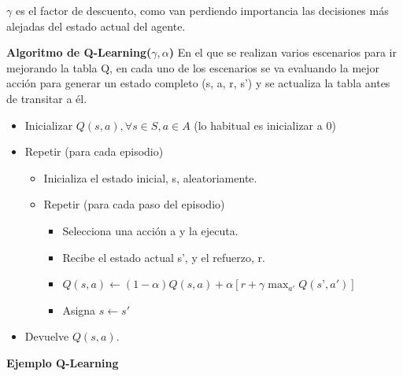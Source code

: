 \documentclass[12pt]{report} %
\begin{document}
$\gamma$ es el factor de descuento, como van perdiendo importancia las decisiones más alejadas del estado actual del agente.

\textbf{Algoritmo de Q-Learning($\gamma, \alpha$)}
En el que se realizan varios escenarios para ir mejorando la tabla Q, en cada uno de los escenarios se va evaluando la mejor acción para generar un estado completo (s, a, r, s') y se actualiza la tabla antes de transitar a él.
\begin{itemize}
  \item Inicializar $Q(s, a), \forall s \in S, a \in A$ (lo habitual es inicializar a 0)
  \item Repetir (para cada episodio)
  \begin{itemize}
    \item Inicializa el estado inicial, s, aleatoriamente.
    \item Repetir (para cada paso del episodio)
    \begin{itemize}
      \item Selecciona una acción a y la ejecuta.
      \item Recibe el estado actual s', y el refuerzo, r.
      \item $Q(s, a) \leftarrow (1-\alpha) Q(s, a) + \alpha[r + \gamma \max_{a'} Q(s’, a')]$      
      \item Asigna $s \leftarrow s'$
    \end{itemize}
  \end{itemize}
  \item Devuelve $Q(s, a)$.
\end{itemize}

\textbf{Ejemplo Q-Learning}
\end{document}
